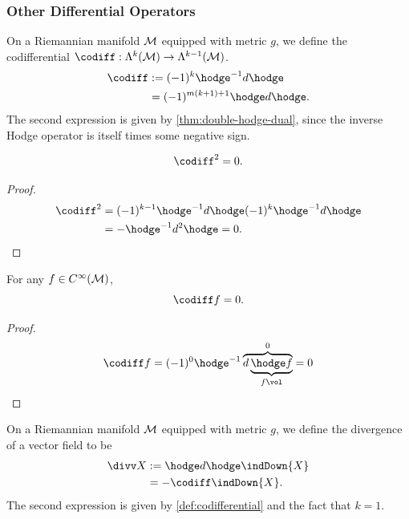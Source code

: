\documentclass[../main.tex]{subfiles}
\begin{document}
    \subsubsection{Other Differential Operators}
    \begin{definition}[Codifferential]\label{def:codifferential}
        On a Riemannian manifold \(\manifold[M]\) equipped with metric \(g\), we 
        define the codifferential \(\codiff : \form{k}{M}\to \form{k-1}{M}\).
        \[
        \begin{aligned}
            \codiff &:=(-1)^k\hodge ^{-1} d\hodge\\
            &=(-1)^{m(k+1)+1}\hodge d\hodge.
        \end{aligned}
        \]
        The second expression is given by \cref{thm:double-hodge-dual}, since the 
        inverse Hodge operator is itself times some negative sign.
    \end{definition}
    \begin{theorem}\label{thm:double-codifferential}
        \[
        \codiff^2=0.
        \]
    \end{theorem}
    \begin{proof}
        \[
        \begin{aligned}
            \codiff^2&=(-1)^{k-1}\hodge ^{-1} d \hodge (-1)^k \hodge ^{-1} d \hodge \\
            &=-\hodge ^{-1}d^2\hodge =0.
        \end{aligned}
        \]
    \end{proof}
    \begin{theorem}\label{thm:function-codiff}
        For any \(f \in C^\infty(\manifold[M])\), 
        \[
        \codiff f = 0.
        \]
    \end{theorem}
    \begin{proof}
        \[
        \codiff f = (-1)^0\hodge ^{-1}\overbrace{d\underbrace{\hodge f}_{f\vol}}
        ^{0}=0
        \]
    \end{proof}
    \begin{definition}[Divergence]\label{def:divergence-vector-field}
        On a Riemannian manifold \(\manifold[M]\) equipped with metric \(g\), we 
        define the divergence of a vector field to be 
        \[
        \begin{aligned}
            \divv X &:=\hodge d \hodge \indDown{X}\\
            &= -\codiff \indDown{X}.
        \end{aligned}
        \]
        The second expression is given by \cref{def:codifferential} and the fact 
        that \(k=1\).
    \end{definition}
\end{document}
